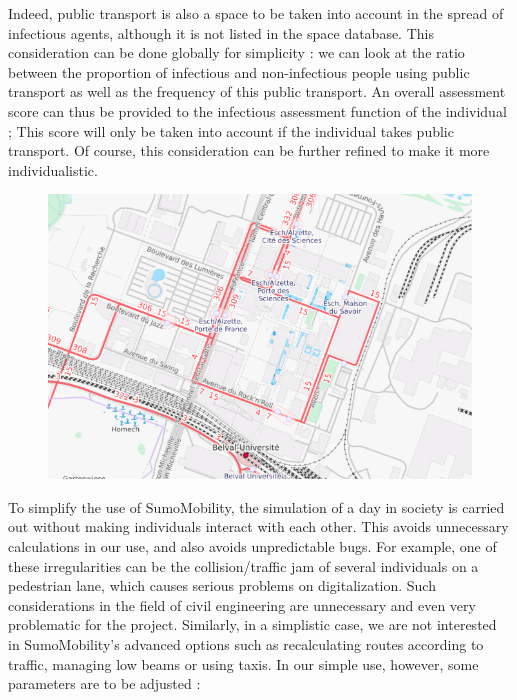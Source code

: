 Indeed, public transport is also a space to be taken into account in the spread of infectious agents, although it is not listed in the space database. This consideration can be done globally for simplicity : we can look at the ratio between the proportion of infectious and non-infectious people using public transport as well as the frequency of this public transport. An overall assessment score can thus be provided to the infectious assessment function of the individual ; This score will only be taken into account if the individual takes public transport. Of course, this consideration can be further refined to make it more individualistic.\\

\begin{figure}[h]
  \centering
  \includegraphics[width=0.8\linewidth]{Media/BelvalOSMTP.png}
  \caption{}
  \label{fig:belvalosmtp}
\end{figure}

To simplify the use of SumoMobility, the simulation of a day in society is carried out without making individuals interact with each other. This avoids unnecessary calculations in our use, and also avoids unpredictable bugs. For example, one of these irregularities can be the collision/traffic jam of several individuals on a pedestrian lane, which causes serious problems on digitalization. Such considerations in the field of civil engineering are unnecessary and even very problematic for the project. Similarly, in a simplistic case, we are not interested in SumoMobility's advanced options such as recalculating routes according to traffic, managing low beams or using taxis. In our simple use, however, some parameters are to be adjusted :\\

